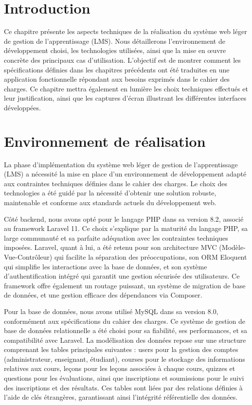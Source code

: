 \documentclass[12pt,a4paper]{report}
\begin{document}
\section{Introduction}
Ce chapitre présente les aspects techniques de la réalisation du système web léger de gestion de l'apprentissage (LMS). Nous détaillerons l'environnement de développement choisi, les technologies utilisées, ainsi que la mise en œuvre concrète des principaux cas d'utilisation. L'objectif est de montrer comment les spécifications définies dans les chapitres précédents ont été traduites en une application fonctionnelle répondant aux besoins exprimés dans le cahier des charges. Ce chapitre mettra également en lumière les choix techniques effectués et leur justification, ainsi que les captures d'écran illustrant les différentes interfaces développées.

\section{Environnement de réalisation}
La phase d'implémentation du système web léger de gestion de l'apprentissage (LMS) a nécessité la mise en place d'un environnement de développement adapté aux contraintes techniques définies dans le cahier des charges. Le choix des technologies a été guidé par la nécessité d'obtenir une solution robuste, maintenable et conforme aux standards actuels du développement web.

Côté backend, nous avons opté pour le langage PHP dans sa version 8.2, associé au framework Laravel 11. Ce choix s'explique par la maturité du langage PHP, sa large communauté et sa parfaite adéquation avec les contraintes techniques imposées. Laravel, quant à lui, a été retenu pour son architecture MVC (Modèle-Vue-Contrôleur) qui facilite la séparation des préoccupations, son ORM Eloquent qui simplifie les interactions avec la base de données, et son système d'authentification intégré qui garantit une gestion sécurisée des utilisateurs. Ce framework offre également un routage puissant, un système de migration de base de données, et une gestion efficace des dépendances via Composer.

Pour la base de données, nous avons utilisé MySQL dans sa version 8.0, conformément aux spécifications du cahier des charges. Ce système de gestion de base de données relationnelle a été choisi pour sa fiabilité, ses performances, et sa compatibilité avec Laravel. La modélisation des données repose sur une structure comprenant les tables principales suivantes : users pour la gestion des comptes (administrateur, enseignant, étudiant), courses pour le stockage des informations relatives aux cours, leçons pour les leçons associées à chaque cours, quizzes et questions pour les évaluations, ainsi que inscriptions et soumissions pour le suivi des inscriptions et des résultats. Ces tables sont liées par des relations définies à l'aide de clés étrangères, garantissant ainsi l'intégrité référentielle des données.
\end{document}
